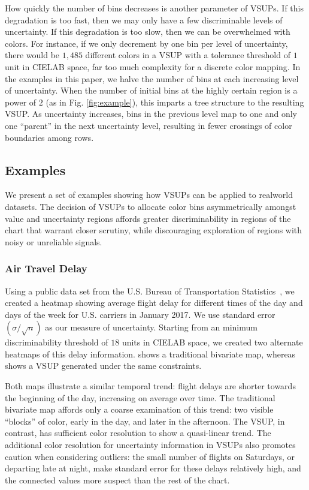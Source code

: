 How quickly the number of bins decreases is another parameter of VSUPs. If this degradation is too fast, then we may only have a few discriminable levels of uncertainty. If this degradation is too slow, then we can be overwhelmed with colors. For instance, if we only decrement by one bin per level of uncertainty, there would be $1,485$ different colors in a VSUP with a tolerance threshold of $1$ unit in CIELAB space, far too much complexity for a discrete color mapping. In the examples in this paper, we halve the number of bins at each increasing level of uncertainty. When the number of initial bins at the highly certain region is a power of $2$ (as in Fig. \ref{fig:example}), this imparts a tree structure to the resulting VSUP. As uncertainty increases, bins in the previous level map to one and only one ``parent'' in the next uncertainty level, resulting in fewer crossings of color boundaries among rows.

\subsection{Examples}

We present a set of examples showing how VSUPs can be applied to realworld datasets. The decision of VSUPs to allocate color bins asymmetrically amongst value and uncertainty regions affords greater discriminability in regions of the chart that warrant closer scrutiny, while discouraging exploration of regions with noisy or unreliable signals.


\subsubsection{Air Travel Delay}

\airlineFig

Using a public data set from the U.S. Bureau of Transportation Statistics~\cite{bts}, we created a heatmap showing average flight delay for different times of the day and days of the week for U.S. carriers in January 2017. We use standard error $\left(\sigma / \sqrt{n}\right)$ as our measure of uncertainty. Starting from an minimum discriminability threshold of $18$ units in CIELAB space, we created two alternate heatmaps of this delay information.  shows a traditional bivariate map, whereas  shows a VSUP generated under the same constraints.

Both maps illustrate a similar temporal trend: flight delays are shorter towards the beginning of the day, increasing on average over time. The traditional bivariate map affords only a coarse examination of this trend: two visible ``blocks'' of color, early in the day, and later in the afternoon. The VSUP, in contrast, has sufficient color resolution to show a quasi-linear trend. The additional color resolution for uncertainty information in VSUPs also promotes caution when considering outliers: the small number of flights on Saturdays, or departing late at night, make standard error for these delays relatively high, and the connected values more suspect than the rest of the chart.

